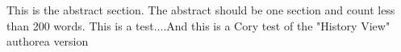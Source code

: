 This is the abstract section. The abstract should be one section and count less than 200 words. This is a test....And this is a Cory test of the "History View" authorea version 